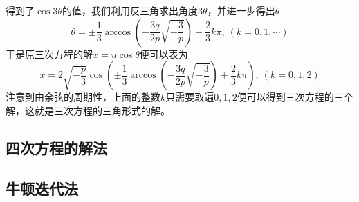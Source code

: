 得到了$\cos{3\theta}$的值，我们利用反三角求出角度$3\theta$，并进一步得出$\theta$
\[ \theta= \pm \frac{1}{3}\arccos \left( -\frac{3q}{2p}\sqrt{-\frac{3}{p}} \right) + \frac{2}{3}k\pi, \  (k=0,1,\cdots) \]
于是原三次方程的解$x=u\cos{\theta}$便可以表为
\[ x=2\sqrt{-\frac{p}{3}} \cos{\left( \pm \frac{1}{3}\arccos \left( -\frac{3q}{2p}\sqrt{-\frac{3}{p}} \right) + \frac{2}{3}k\pi \right)}, \  (k=0,1,2) \]
注意到由余弦的周期性，上面的整数$k$只需要取遍$0,1,2$便可以得到三次方程的三个解，这就是三次方程的三角形式的解。

\subsection{四次方程的解法}
\label{sec:solve-equation-with-4-degree}

\subsection{牛顿迭代法}
\label{sec:newton-iterator-method}



